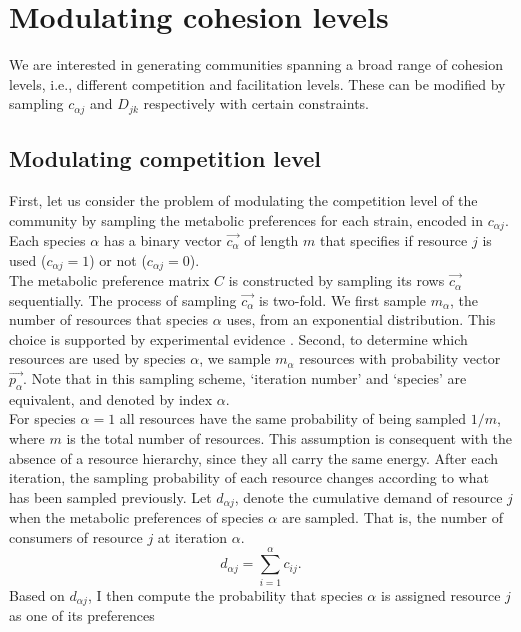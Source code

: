 \documentclass[12pt]{article}
\begin{document}
\section{Modulating cohesion levels}\label{derivation_micro_structure_supp}

We are interested in generating communities spanning a broad range of cohesion levels, i.e., different competition and facilitation levels. These can be modified by sampling $ c_{{\alpha}j} $ and $ D_{jk} $ respectively with certain constraints.

\subsection*{Modulating competition level}
First, let us consider the problem of modulating the competition level of the community by sampling the metabolic preferences for each strain, encoded in  $ c_{{\alpha}j} $. Each species $ {\alpha} $ has a binary vector $ \vec{c_{\alpha}} $ of length $ m $ that specifies if resource $ j $ is used ($ c_{{\alpha}j} = 1 $) or not ($ c_{{\alpha}j} = 0 $). \\
The metabolic preference matrix $ C $ is constructed by sampling its rows $ \vec{c_{\alpha}} $ sequentially. The process of sampling $ \vec{c_{\alpha}} $ is two-fold. We first sample $ m_{\alpha} $, the number of resources that species $ {\alpha} $ uses, from an exponential distribution. This choice is supported by experimental evidence \citep{Sung2017}. Second, to determine which resources are used by species $ {\alpha} $, we sample $ m_{\alpha} $ resources with probability vector $ \vec{p_{\alpha}} $. Note that in this sampling scheme, `iteration number' and `species' are equivalent, and denoted by index ${\alpha}$.\\
For species $ {\alpha} = 1 $ all resources have the same probability of being sampled $ 1/m $, where $ m $ is the total number of resources. This assumption is consequent with the absence of a resource hierarchy, since they all carry the same energy. After each iteration, the sampling probability of each resource changes according to what has been sampled previously. Let $ d_{{\alpha}j} $, denote the cumulative demand of resource $ j $ when the metabolic preferences of species $ {\alpha} $ are sampled. That is, the number of consumers of resource $ j $ at iteration $ {\alpha} $.
\begin{equation*}
	d_{{\alpha}j}  = \sum_{i = 1}^{{\alpha}}c_{ij}.
\end{equation*}
Based on $ d_{{\alpha}j} $, I then compute the probability that species $ {\alpha} $ is assigned resource $ j $ as one of its preferences
\end{document}
